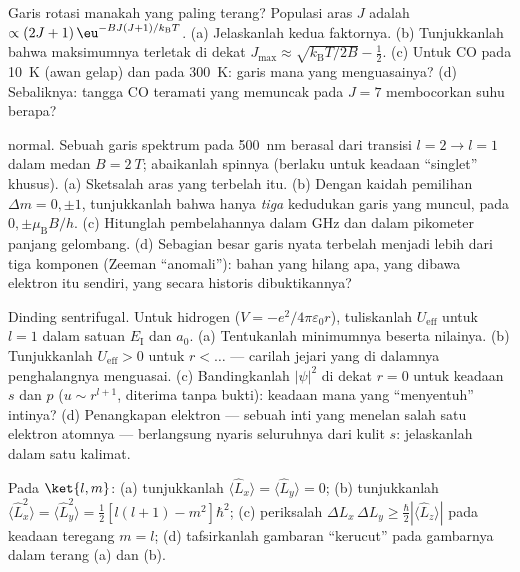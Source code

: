 \begin{exercise}[$\star\star$]\label{exo:b3:quantum-angular-momentum:6}
Garis rotasi manakah yang paling terang? Populasi aras $J$ adalah
$\propto (2J+1)\,\eu^{-BJ(J+1)/k_{\text{B}}T}$. (a) Jelaskanlah kedua
faktornya. (b) Tunjukkanlah bahwa maksimumnya terletak di dekat $J_{\max} \approx
\sqrt{k_{\text{B}}T/2B} - \tfrac12$. (c) Untuk CO pada \qty{10}{K}
(awan gelap) dan pada \qty{300}{K}: garis mana yang menguasainya? (d)
Sebaliknya: tangga CO teramati yang memuncak pada $J = 7$ membocorkan
suhu berapa?
\end{exercise}

\begin{exercise}[$\star\star$]\label{exo:b3:quantum-angular-momentum:7}
 normal. Sebuah garis spektrum pada \qty{500}{nm} berasal
dari transisi $l = 2 \to l = 1$ dalam medan $B = \qty{2}{T}$;
abaikanlah spinnya (berlaku untuk keadaan ``singlet'' khusus). (a)
Sketsalah aras yang terbelah itu. (b) Dengan kaidah pemilihan
$\Delta m = 0, \pm1$, tunjukkanlah bahwa hanya \emph{tiga} kedudukan
garis yang muncul, pada $0, \pm\mu_{\text{B}}B/h$.
(c) Hitunglah pembelahannya dalam GHz dan dalam pikometer panjang
gelombang. (d) Sebagian besar garis nyata terbelah menjadi lebih dari
tiga komponen (Zeeman ``anomali''): bahan yang hilang apa, yang dibawa
elektron itu sendiri, yang secara historis dibuktikannya?
\end{exercise}

\begin{exercise}[$\star\star$]\label{exo:b3:quantum-angular-momentum:8}
Dinding sentrifugal. Untuk hidrogen ($V = -e^2/4\pi\varepsilon_0r$),
tuliskanlah $U_{\text{eff}}$ untuk $l = 1$ dalam satuan $E_{\text{I}}$
dan $a_0$. (a) Tentukanlah minimumnya beserta nilainya. (b)
Tunjukkanlah $U_{\text{eff}} >
0$ untuk $r < \dots$ --- carilah jejari yang di dalamnya penghalangnya
menguasai. (c) Bandingkanlah $|\psi|^2$ di dekat $r = 0$ untuk keadaan
$s$ dan $p$ ($u \sim r^{l+1}$, diterima tanpa bukti): keadaan mana yang
``menyentuh'' intinya? (d) Penangkapan elektron --- sebuah inti yang
menelan salah satu elektron atomnya --- berlangsung nyaris seluruhnya
dari kulit $s$: jelaskanlah dalam satu kalimat.
\end{exercise}

\begin{exercise}[$\star\star$]\label{exo:b3:quantum-angular-momentum:9}
Pada $\ket{l, m}$: (a) tunjukkanlah $\langle\hat L_x\rangle = \langle\hat
L_y\rangle = 0$; (b) tunjukkanlah $\langle\hat L_x^2\rangle = \langle\hat
L_y^2\rangle = \tfrac12[l(l+1) - m^2]\hbar^2$; (c) periksalah  $\Delta L_x\,\Delta L_y \ge \tfrac\hbar2
|\langle\hat L_z\rangle|$ pada keadaan teregang $m = l$; (d)
tafsirkanlah gambaran ``kerucut'' pada gambarnya dalam terang (a) dan
(b).
\end{exercise}

